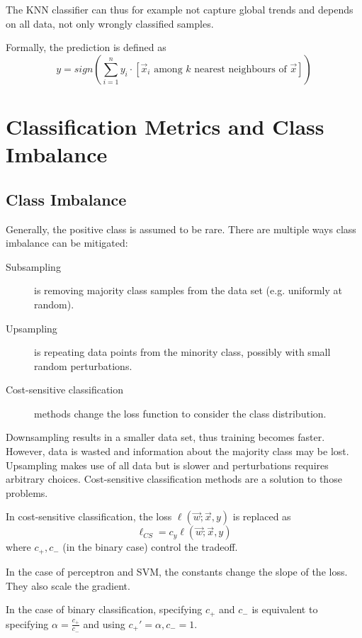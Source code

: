 The KNN classifier can thus for example
not capture global trends and depends on
all data, not only wrongly classified samples.

Formally, the prediction is defined as
\begin{equation*}
y = sign\left(
\sum_{i=1}^n{y_i \cdot
	[\text{$\vec{x}_i$ among $k$ nearest neighbours of $\vec{x}$}]
}
\right)
\end{equation*}


\section{Classification Metrics and Class Imbalance}

\subsection{Class Imbalance}
Generally, the positive class is assumed to be rare.
There are multiple ways class imbalance can be mitigated:

\begin{description}
	\item[Subsampling] is removing majority class samples
	from the data set (e.g. uniformly at random).
	\item[Upsampling] is repeating data points from the
	minority class, possibly with small random perturbations.
	\item[Cost-sensitive classification] methods change
	the loss function to consider the class distribution.
\end{description}

Downsampling results in a smaller data set, thus training
becomes faster. However, data is wasted and information about
the majority class may be lost.
Upsampling makes use of all data but is slower and
perturbations requires arbitrary choices.
Cost-sensitive classification methods are a solution
to those problems.

In cost-sensitive classification,
the loss $\ell(\vec{w}; \vec{x}, y)$ is replaced as
\begin{equation*}
\ell_{CS} = c_y \ell(\vec{w}; \vec{x}, y)
\end{equation*}
where $c_{+}, c_{-}$ (in the binary case) control the tradeoff.

In the case of perceptron and SVM, the constants change the
slope of the loss.
They also scale the gradient.

In the case of binary classification, specifying
$c_{+}$ and $c_{-}$ is equivalent to specifying
$\alpha = \frac{c_{+}}{c_{-}}$ and using
$c_{+}' = \alpha, c_{-} = 1$.

